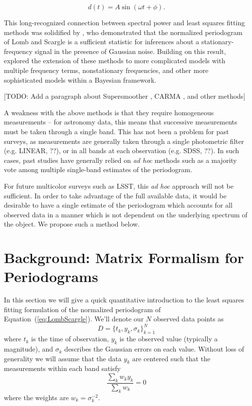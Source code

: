 \documentclass[12pt,preprint]{aastex}
\newcommand{\todo}[1]{{\color{red} [TODO: #1]}}
\newcommand{\foreign}[1]{{\it #1}}
\newcommand{\adhoc}{\foreign{ad hoc}}
\newcommand{\Eq}[1]{Equation~(\ref{eq:#1})}
\newcommand{\eq}[1]{\Eq{#1}}
\newcommand{\eqlabel}[1]{\label{eq:#1}}
\begin{document}
\begin{equation}
  \eqlabel{SingleModel}
  d(t) = A\sin(\omega t + \phi).
\end{equation}

This long-recognized connection between spectral power and least squares fitting methods was solidified by \citet{Jaynes87}, who demonstrated that the normalized periodogram of Lomb and Scargle is a sufficient statistic for inferences about a stationary-frequency signal in the presence of Gaussian noise. Building on this result, \citet{Bretthorst88} explored the extension of these methods to more complicated models with multiple frequency terms, nonstationary frequencies, and other more sophisticated models within a Bayesian framework.

\todo{Add a paragraph about Supersmoother \citep{Reimann94}, CARMA \citep{Kelly14}, and other methods}

A weakness with the above methods is that they require homogeneous measurements -- for astronomy data, this means that successive measurements must be taken through a single band. This has not been a problem for past surveys, as measurements are generally taken through a single photometric filter (e.g. LINEAR, ??), or in all bands at each observation (e.g. SDSS, ??). In such cases, past studies have generally relied on \adhoc{} methods such as a majority vote among multiple single-band estimates of the periodogram.

For future multicolor surveys such as LSST, this \adhoc{} approach will not be sufficient. In order to take advantage of the full available data, it would be desirable to have a single estimate of the periodogram which accounts for all observed data in a manner which is not dependent on the underlying spectrum of the object. We propose such a method below.


\section{Background: Matrix Formalism for Periodograms}

In this section we will give a quick quantitative introduction to the least squares fitting formulation of the normalized periodogram of \eq{LombScargle}. We'll denote our $N$ observed data points as
\begin{equation}
  D = \{t_k, y_k, \sigma_k\}_{k=1}^N
\end{equation}
where $t_k$ is the time of observation, $y_k$ is the observed value (typically a magnitude), and $\sigma_k$ describes the Gaussian errors on each value. Without loss of generality we will assume that the data $y_k$ are centered such that the measurements within each band satisfy
\begin{equation}
  \eqlabel{ycentered}
  \frac{\sum_k w_ky_k}{\sum_k w_k} = 0
\end{equation}
where the weights are $w_k = \sigma_k^{-2}$.
\end{document}
